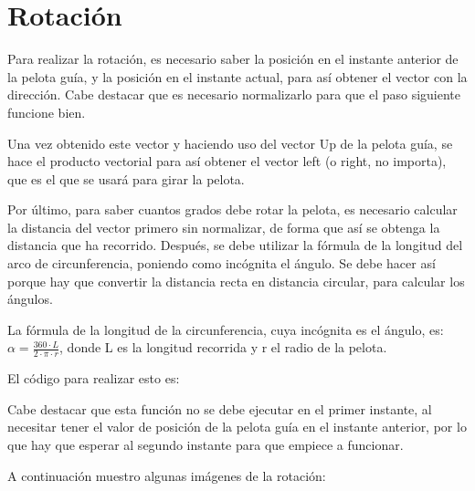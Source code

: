 \section{Rotación}

Para realizar la rotación, es necesario saber la posición en el instante anterior de la pelota guía, y la posición en el instante actual, para así obtener el vector con la dirección. Cabe destacar que es necesario normalizarlo para que el paso siguiente funcione bien.

\bigskip

Una vez obtenido este vector y haciendo uso del vector Up de la pelota guía, se hace el producto vectorial para así obtener el vector left (o right, no importa), que es el que se usará para girar la pelota.

\bigskip

Por último, para saber cuantos grados debe rotar la pelota, es necesario calcular la distancia del vector primero sin normalizar, de forma que así se obtenga la distancia que ha recorrido. Después, se debe utilizar la fórmula de la longitud del arco de circunferencia, poniendo como incógnita el ángulo. Se debe hacer así porque hay que convertir la distancia recta en distancia circular, para calcular los ángulos. 

\bigskip

La fórmula de la longitud de la circunferencia, cuya incógnita es el ángulo, es: $\alpha = \frac{360 \cdot L}{2 \cdot \pi \cdot r} $, donde L es la longitud recorrida y r el radio de la pelota.

\bigskip

El código para realizar esto es:



Cabe destacar que esta función no se debe ejecutar en el primer instante, al necesitar tener el valor de posición de la pelota guía en el instante anterior, por lo que hay que esperar al segundo instante para que empiece a funcionar.

\bigskip

A continuación muestro algunas imágenes de la rotación:

